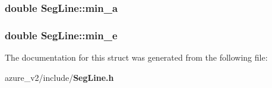 \subsubsection{\setlength{\rightskip}{0pt plus 5cm}double \bf{Seg\-Line::min\_\-a}}\label{structSegLine_0fe822855741fa984259dec222a8e286}


\subsubsection{\setlength{\rightskip}{0pt plus 5cm}double \bf{Seg\-Line::min\_\-e}}\label{structSegLine_526e764c809492a949a17b8b3399259d}




The documentation for this struct was generated from the following file:\begin{CompactItemize}
\item 
azure\_\-v2/include/\bf{Seg\-Line.h}\end{CompactItemize}
